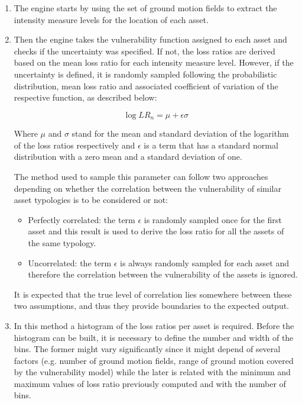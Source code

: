 \begin{enumerate}
\item The  engine starts by using the set of ground motion fields to extract the intensity measure levels for the location of each asset. 
 
\item Then the engine takes the vulnerability function assigned to each asset and checks if the uncertainty was specified. If not, the loss ratios are derived based on the mean loss ratio for each intensity measure level. However, if the uncertainty is defined, it is randomly sampled following the probabilistic distribution, mean loss ratio and associated coefficient of variation of the respective function, as described below:

\begin{equation}
\log{LR_n} = \mu + \epsilon\sigma
\end{equation}

Where $\mu$ and $\sigma$ stand for the mean and standard deviation of the logarithm of the loss ratios respectively and $\epsilon$ is a term that has a standard normal distribution with a zero mean and a standard deviation of one.  

The method used to sample this parameter can follow two approaches depending on whether the correlation between the vulnerability of similar asset typologies is to be considered or not:

\begin{itemize}

\item Perfectly correlated: the term $\epsilon$ is randomly sampled once for the first asset and this result is used to derive the loss ratio for all the assets of the same typology. 

\item Uncorrelated: the term $\epsilon$ is always randomly sampled for each asset and therefore the correlation between the vulnerability of the assets is ignored.

\end{itemize}

It is expected that the true level of correlation lies somewhere between these two assumptions, and thus they provide boundaries to the expected output. 

\item In this method a histogram of the loss ratios per asset is required. Before the histogram can be built, it is necessary to define the number and width of the bins. The former might vary significantly since it might depend of several factors (e.g. number of ground motion fields, range of ground motion covered by the vulnerability model) while the later is related with the minimum and maximum values of loss ratio previously computed and with the number of bins. 


\end{enumerate}
